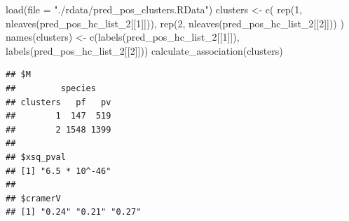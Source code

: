 \documentclass[
  11pt,
  oneside]{book}
\newenvironment{Shaded}{\begin{snugshade}}{\end{snugshade}}
\newcommand{\AttributeTok}[1]{\textcolor[rgb]{0.77,0.63,0.00}{#1}}
\newcommand{\DecValTok}[1]{\textcolor[rgb]{0.00,0.00,0.81}{#1}}
\newcommand{\FunctionTok}[1]{\textcolor[rgb]{0.00,0.00,0.00}{#1}}
\newcommand{\NormalTok}[1]{#1}
\newcommand{\OtherTok}[1]{\textcolor[rgb]{0.56,0.35,0.01}{#1}}
\newcommand{\StringTok}[1]{\textcolor[rgb]{0.31,0.60,0.02}{#1}}
\begin{document}
\begin{Shaded}
\begin{Highlighting}[]
\FunctionTok{load}\NormalTok{(}\AttributeTok{file =} \StringTok{"./rdata/pred\_pos\_clusters.RData"}\NormalTok{)}
\NormalTok{clusters }\OtherTok{\textless{}{-}} \FunctionTok{c}\NormalTok{(}
  \FunctionTok{rep}\NormalTok{(}\DecValTok{1}\NormalTok{, }\FunctionTok{nleaves}\NormalTok{(pred\_pos\_hc\_list\_2[[}\DecValTok{1}\NormalTok{]])),}
  \FunctionTok{rep}\NormalTok{(}\DecValTok{2}\NormalTok{, }\FunctionTok{nleaves}\NormalTok{(pred\_pos\_hc\_list\_2[[}\DecValTok{2}\NormalTok{]]))}
\NormalTok{)}
\FunctionTok{names}\NormalTok{(clusters) }\OtherTok{\textless{}{-}} \FunctionTok{c}\NormalTok{(}\FunctionTok{labels}\NormalTok{(pred\_pos\_hc\_list\_2[[}\DecValTok{1}\NormalTok{]]), }\FunctionTok{labels}\NormalTok{(pred\_pos\_hc\_list\_2[[}\DecValTok{2}\NormalTok{]]))}
\FunctionTok{calculate\_association}\NormalTok{(clusters)}
\end{Highlighting}
\end{Shaded}

\begin{verbatim}
## $M
##         species
## clusters   pf   pv
##        1  147  519
##        2 1548 1399
## 
## $xsq_pval
## [1] "6.5 * 10^-46"
## 
## $cramerV
## [1] "0.24" "0.21" "0.27"
\end{verbatim}
\end{document}

